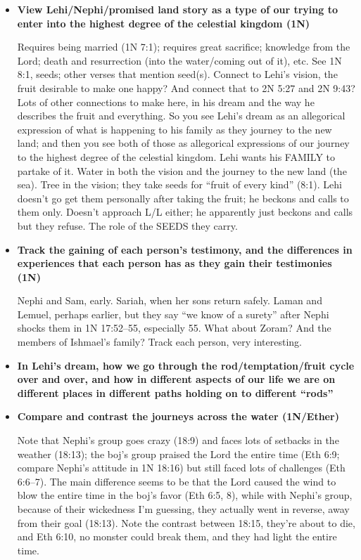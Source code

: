 \begin{itemize}

\item \textbf{View Lehi/Nephi/promised land story as a type of our trying to enter into the highest degree of the celestial kingdom (1N)}

	Requires being married (1N 7:1); requires great sacrifice; knowledge from the Lord; death and resurrection (into the water/coming out of it), etc.
	See 1N 8:1, seeds; other verses that mention seed(s).
	Connect to Lehi's vision, the fruit desirable to make one happy? And connect that to 2N 5:27 and 2N 9:43? Lots of other connections to make here, in his dream and the way he describes the fruit and everything.
		So you see Lehi's dream as an allegorical expression of what is happening to his family as they journey to the new land; and then you see both of those as allegorical expressions of our journey to the highest degree of the celestial kingdom.
		Lehi wants his FAMILY to partake of it.
		Water in both the vision and the journey to the new land (the sea).
		Tree in the vision; they take seeds for ``fruit of every kind'' (8:1).
		Lehi doesn't go get them personally after taking the fruit; he beckons and calls to them only. Doesn't approach L/L either; he apparently just beckons and calls but they refuse.
		The role of the SEEDS they carry.
		
\item \textbf{Track the gaining of each person's testimony, and the differences in experiences that each person has as they gain their testimonies (1N)}

	Nephi and Sam, early. Sariah, when her sons return safely. Laman and Lemuel, perhaps earlier, but they say ``we know of a surety'' after Nephi shocks them in 1N 17:52--55, especially 55. What about Zoram? And the members of Ishmael's family? Track each person, very interesting.
	
\item \textbf{In Lehi's dream, how we go through the rod/temptation/fruit cycle over and over, and how in different aspects of our life we are on different places in different paths holding on to different ``rods''}
	
\item \textbf{Compare and contrast the journeys across the water (1N/Ether)}

	Note that Nephi's group goes crazy (18:9) and faces lots of setbacks in the weather (18:13); the boj's group praised the Lord the entire time (Eth 6:9; compare Nephi's attitude in 1N 18:16) but still faced lots of challenges (Eth 6:6--7). The main difference seems to be that the Lord caused the wind to blow the entire time in the boj's favor (Eth 6:5, 8), while with Nephi's group, because of their wickedness I'm guessing, they actually went in reverse, away from their goal (18:13). Note the contrast between 18:15, they're about to die, and Eth 6:10, no monster could break them, and they had light the entire time.
	

\end{itemize}
